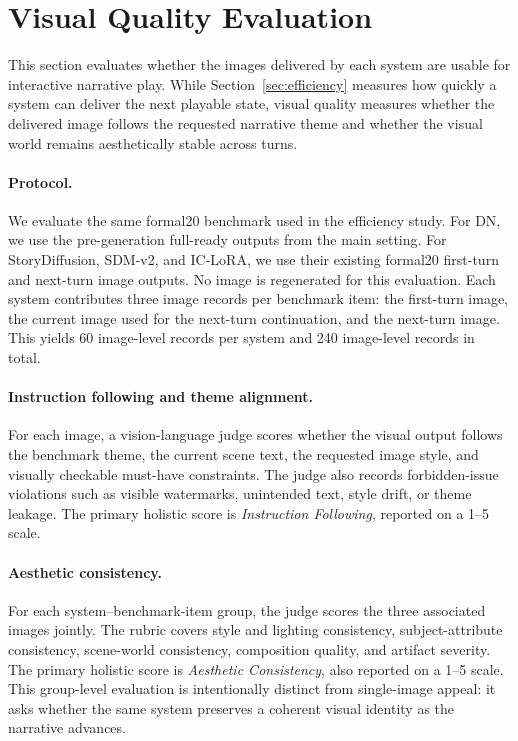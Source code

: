 ﻿\section{Visual Quality Evaluation}
\label{sec:visual-quality}

This section evaluates whether the images delivered by each system are usable for interactive narrative play. While Section~\ref{sec:efficiency} measures how quickly a system can deliver the next playable state, visual quality measures whether the delivered image follows the requested narrative theme and whether the visual world remains aesthetically stable across turns.

\paragraph{Protocol.}
We evaluate the same formal20 benchmark used in the efficiency study. For DN, we use the pre-generation full-ready outputs from the main setting. For StoryDiffusion, SDM-v2, and IC-LoRA, we use their existing formal20 first-turn and next-turn image outputs. No image is regenerated for this evaluation. Each system contributes three image records per benchmark item: the first-turn image, the current image used for the next-turn continuation, and the next-turn image. This yields 60 image-level records per system and 240 image-level records in total.

\paragraph{Instruction following and theme alignment.}
For each image, a vision-language judge scores whether the visual output follows the benchmark theme, the current scene text, the requested image style, and visually checkable must-have constraints. The judge also records forbidden-issue violations such as visible watermarks, unintended text, style drift, or theme leakage. The primary holistic score is \emph{Instruction Following}, reported on a 1--5 scale.

\paragraph{Aesthetic consistency.}
For each system--benchmark-item group, the judge scores the three associated images jointly. The rubric covers style and lighting consistency, subject-attribute consistency, scene-world consistency, composition quality, and artifact severity. The primary holistic score is \emph{Aesthetic Consistency}, also reported on a 1--5 scale. This group-level evaluation is intentionally distinct from single-image appeal: it asks whether the same system preserves a coherent visual identity as the narrative advances.

